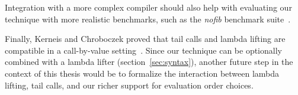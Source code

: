 \documentclass[diploma]{softlab-thesis}
\begin{document}

Integration with a more complex compiler should also help with
evaluating our technique with more realistic benchmarks, such as the
\emph{nofib} benchmark suite~\cite{nofib}.

Finally, Kerneis and Chroboczek proved that tail calls and lambda
lifting are compatible in a call-by-value
setting~\cite{Kerneis2011}. Since our technique can be optionally
combined with a lambda lifter (section~\ref{sec:syntax}), another
future step in the context of this thesis would be to formalize the
interaction between lambda lifting, tail calls, and our richer support
for evaluation order choices.










\backmatter


\end{document}
